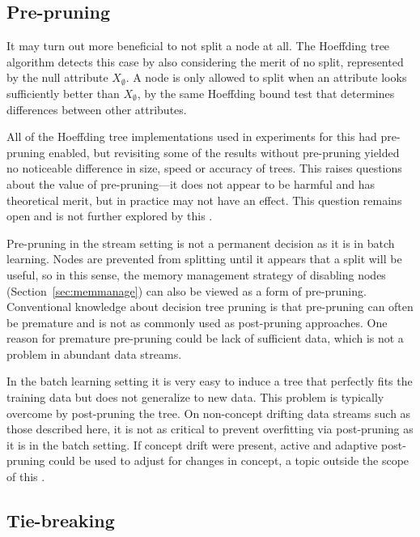 \subsection{Pre-pruning}
\label{sec:preprune}

It may turn out more beneficial to not split a node at all. The Hoeffding tree algorithm detects this case by also considering the merit of no split, represented by the null attribute $X_{\emptyset}$. A node is only allowed to split when an attribute looks sufficiently better than $X_{\emptyset}$, by the same Hoeffding bound test that determines differences between other attributes.

All of the Hoeffding tree implementations used in experiments for this \thesis  had pre-pruning enabled, but revisiting some of the results without pre-pruning yielded %
no noticeable difference in size, speed or accuracy of trees.
This raises questions about the value of pre-pruning---it does not appear to be harmful and has theoretical merit, but in practice may not have an effect. This question remains open and is not further explored by this \thesisc. 

Pre-pruning in the stream setting is not a permanent decision as it is
in batch learning. Nodes are prevented from splitting until it appears
that a split will be useful, so in this sense, the memory management
strategy of disabling nodes (Section~\ref{sec:memmanage}) can also be viewed as a form of pre-pruning. Conventional knowledge about decision tree pruning is that pre-pruning can often be premature and is not as commonly used as post-pruning approaches. One reason for premature pre-pruning could be lack of sufficient data, which is not a problem in abundant data streams.

In the batch learning setting it is very easy to induce a tree that perfectly fits the training data but does not generalize to new data. This problem is typically overcome by post-pruning the tree. On non-concept drifting data streams such as those described here, it is not as critical to prevent overfitting via post-pruning as it is in the batch setting. If concept drift were present, active and adaptive post-pruning could be used to adjust for changes in concept, a topic outside the scope of this \thesisc. 

\subsection{Tie-breaking}
\label{sec:tiebreak}

